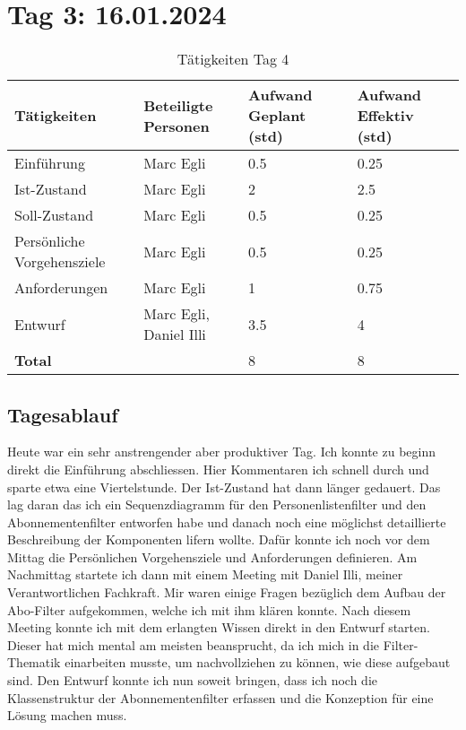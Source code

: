 \section{Tag 3: 16.01.2024}
\begin{table}[H]
    \begin{tabular}{|L{0.4\textwidth}|C{60pt}|C{60pt}|C{60pt}|}
        \hline
        \color{white}Tätigkeiten & \color{white}Beteiligte \color{white}Personen & \color{white}Aufwand Geplant (std) & \color{white}Aufwand Effektiv (std) \\
        \hline
        Einführung & Marc Egli & 0.5 & 0.25 \\
        \hline
        Ist-Zustand & Marc Egli & 2 & 2.5 \\
        \hline
        Soll-Zustand & Marc Egli & 0.5 & 0.25 \\
        \hline
        Persönliche Vorgehensziele & Marc Egli & 0.5 & 0.25 \\
        \hline
        Anforderungen & Marc Egli & 1 & 0.75 \\
        \hline
        Entwurf & Marc Egli, Daniel Illi & 3.5 & 4 \\
        \hline
        \textbf{Total} & & 8 & 8 \\
        \hline
    \end{tabular}
    \caption{Tätigkeiten Tag 4}
\end{table}

\subsection*{Tagesablauf}
Heute war ein sehr anstrengender aber produktiver Tag. Ich konnte zu beginn direkt die Einführung abschliessen. Hier Kommentaren
ich schnell durch und sparte etwa eine Viertelstunde. Der Ist-Zustand hat dann länger gedauert. Das lag daran das ich ein Sequenzdiagramm
für den Personenlistenfilter und den Abonnementenfilter entworfen habe und danach noch eine möglichst detaillierte Beschreibung der Komponenten lifern wollte.
Dafür konnte ich noch vor dem Mittag die Persönlichen Vorgehensziele und Anforderungen definieren. Am Nachmittag startete ich dann mit einem
Meeting mit Daniel Illi, meiner Verantwortlichen Fachkraft. Mir waren einige Fragen bezüglich dem Aufbau der Abo-Filter aufgekommen, welche ich mit ihm
klären konnte. Nach diesem Meeting konnte ich mit dem erlangten Wissen direkt in den Entwurf starten. Dieser hat mich mental am meisten beansprucht, da ich mich 
in die Filter-Thematik einarbeiten musste, um nachvollziehen zu können, wie diese aufgebaut sind. Den Entwurf konnte ich nun soweit bringen,
dass ich noch die Klassenstruktur der Abonnementenfilter erfassen und die Konzeption für eine Lösung machen muss.



